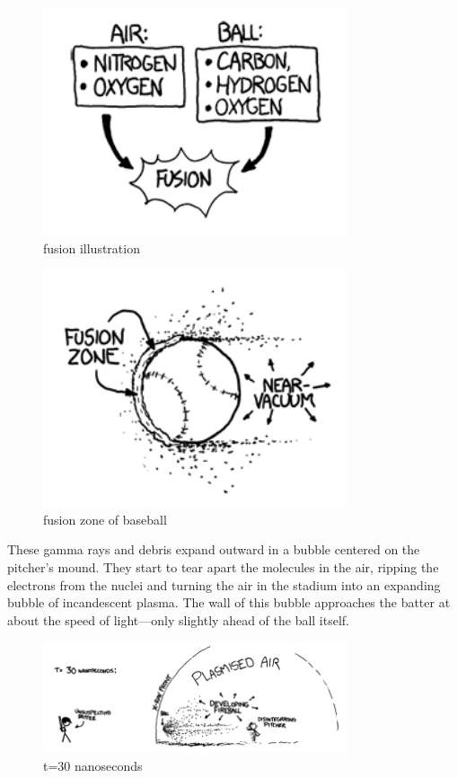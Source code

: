 \begin{figure}[!htbp]
\centering
\includegraphics[scale=0.5, max width=0.8\textwidth]{imgs/a/1/02.png}
\caption{fusion illustration}
\end{figure}

\begin{figure}[!htbp]
\centering
\includegraphics[scale=0.5, max width=0.8\textwidth]{imgs/a/1/03.png}
\caption{fusion zone of baseball}
\end{figure}

{These gamma rays and debris expand outward in a bubble centered on the pitcher’s mound. They start to tear apart the molecules in the air, ripping the electrons from the nuclei and turning the air in the stadium into an expanding bubble of incandescent plasma. The wall of this bubble approaches the batter at about the speed of light—only slightly ahead of the ball itself.}

\begin{figure}[!htbp]
\centering
\includegraphics[scale=0.5, max width=0.8\textwidth]{imgs/a/1/04.png}
\caption{t=30 nanoseconds}
\end{figure}

